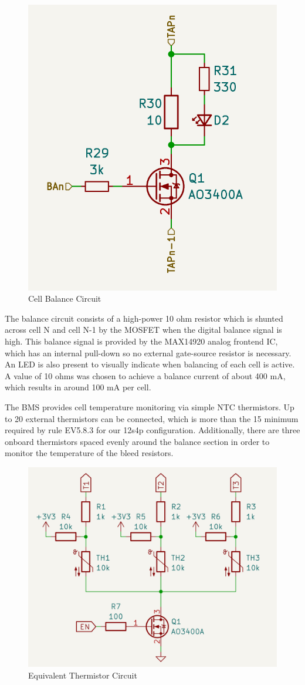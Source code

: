 \documentclass[12pt]{article}
\begin{document}
\begin{figure}[H]
  \centering
  \includegraphics[width=0.6\linewidth]{balance.png}
  \caption{Cell Balance Circuit}
  \label{fig:bms-balance-circuit}
\end{figure}

The balance circuit consists of a high-power 10 ohm resistor which is shunted across cell N and cell N-1 by the MOSFET when the digital balance signal is high.
This balance signal is provided by the MAX14920 analog frontend IC, which has an internal pull-down so no external gate-source resistor is necessary.
An LED is also present to visually indicate when balancing of each cell is active.
A value of 10 ohms was chosen to achieve a balance current of about 400 mA, which results in around 100 mA per cell.

The BMS provides cell temperature monitoring via simple NTC thermistors.
Up to 20 external thermistors can be connected, which is more than the 15 minimum required by rule EV5.8.3 for our 12s4p configuration.
Additionally, there are three onboard thermistors spaced evenly around the balance section in order to monitor the temperature of the bleed resistors.

\begin{figure}[H]
  \centering
  \includegraphics[width=\linewidth]{thermistor.png}
  \caption{Equivalent Thermistor Circuit}
  \label{fig:bms-thermistor-circuit}
\end{figure}
\end{document}
